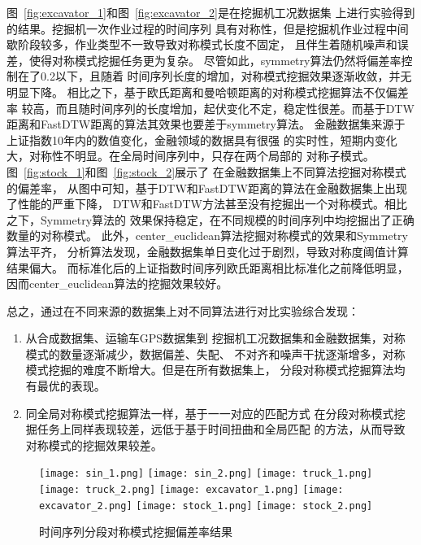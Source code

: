 图~\ref{fig:excavator_1}和图~\ref{fig:excavator_2}是在挖掘机工况数据集
上进行实验得到的结果。挖掘机一次作业过程的时间序列
具有对称性，但是挖掘机作业过程中间歇阶段较多，作业类型不一致导致对称模式长度不固定，
且伴生着随机噪声和误差，使得对称模式挖掘任务更为复杂。
尽管如此，symmetry算法仍然将偏差率控制在了0.2以下，且随着
时间序列长度的增加，对称模式挖掘效果逐渐收敛，并无明显下降。
相比之下，基于欧氏距离和曼哈顿距离的对称模式挖掘算法不仅偏差率
较高，而且随时间序列的长度增加，起伏变化不定，稳定性很差。而基于DTW
距离和FastDTW距离的算法其效果也要差于symmetry算法。
金融数据集来源于上证指数10年内的数值变化，金融领域的数据具有很强
的实时性，短期内变化大，对称性不明显。在全局时间序列中，只存在两个局部的
对称子模式。图~\ref{fig:stock_1}和图~\ref{fig:stock_2}展示了
在金融数据集上不同算法挖掘对称模式的偏差率，
从图中可知，基于DTW和FastDTW距离的算法在金融数据集上出现了性能的严重下降，
DTW和FastDTW方法甚至没有挖掘出一个对称模式。相比之下，Symmetry算法的
效果保持稳定，在不同规模的时间序列中均挖掘出了正确数量的对称模式。
此外，center\_euclidean算法挖掘对称模式的效果和Symmetry算法平齐，
分析算法发现，金融数据集单日变化过于剧烈，导致对称度阈值计算结果偏大。
而标准化后的上证指数时间序列欧氏距离相比标准化之前降低明显，
因而center\_euclidean算法的挖掘效果较好。

总之，通过在不同来源的数据集上对不同算法进行对比实验综合发现：
\begin{enumerate}
  \item 从合成数据集、运输车GPS数据集到
  挖掘机工况数据集和金融数据集，对称模式的数量逐渐减少，数据偏差、失配、
  不对齐和噪声干扰逐渐增多，对称模式挖掘的难度不断增大。但是在所有数据集上，
  分段对称模式挖掘算法均有最优的表现。
  \item 同全局对称模式挖掘算法一样，基于一一对应的匹配方式
  在分段对称模式挖掘任务上同样表现较差，远低于基于时间扭曲和全局匹配
  的方法，从而导致对称模式的挖掘效果较差。
\end{enumerate}


\begin{figure}
  \centering
  {\texttt{[image: sin\_1.png]}}
  {\texttt{[image: sin\_2.png]}}
  {\texttt{[image: truck\_1.png]}}
  {\texttt{[image: truck\_2.png]}}
  {\texttt{[image: excavator\_1.png]}}
  {\texttt{[image: excavator\_2.png]}}
  {\texttt{[image: stock\_1.png]}}
  {\texttt{[image: stock\_2.png]}}
  \caption{时间序列分段对称模式挖掘偏差率结果}
  \label{fig:segement_symmetry}
\end{figure}

